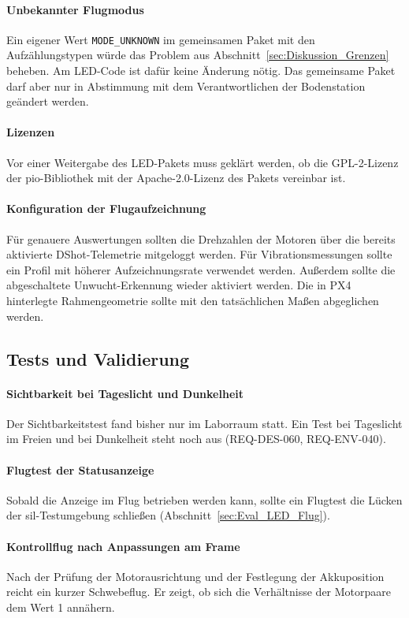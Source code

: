     \paragraph{Unbekannter Flugmodus}
    Ein eigener Wert \texttt{MODE\_UNKNOWN} im gemeinsamen Paket mit den Aufzählungstypen würde das Problem aus Abschnitt~\ref{sec:Diskussion_Grenzen} beheben. Am LED-Code ist dafür keine Änderung nötig. Das gemeinsame Paket darf aber nur in Abstimmung mit dem Verantwortlichen der Bodenstation geändert werden.

    \paragraph{Lizenzen}
    Vor einer Weitergabe des LED-Pakets muss geklärt werden, ob die GPL-2-Lizenz der \gls{pio}-Bibliothek mit der Apache-2.0-Lizenz des Pakets vereinbar ist.

    \paragraph{Konfiguration der Flugaufzeichnung}
    Für genauere Auswertungen sollten die Drehzahlen der Motoren über die bereits aktivierte DShot-Telemetrie mitgeloggt werden. Für Vibrationsmessungen sollte ein Profil mit höherer Aufzeichnungsrate verwendet werden. Außerdem sollte die abgeschaltete Unwucht-Erkennung wieder aktiviert werden. Die in PX4 hinterlegte Rahmengeometrie sollte mit den tatsächlichen Maßen abgeglichen werden.

    \subsection{Tests und Validierung}
    \label{sec:Ausblick_Tests}

    \paragraph{Sichtbarkeit bei Tageslicht und Dunkelheit}
    Der Sichtbarkeitstest fand bisher nur im Laborraum statt. Ein Test bei Tageslicht im Freien und bei Dunkelheit steht noch aus (REQ-DES-060, REQ-ENV-040).

    \paragraph{Flugtest der Statusanzeige}
    Sobald die Anzeige im Flug betrieben werden kann, sollte ein Flugtest die Lücken der \gls{sil}-Testumgebung schließen (Abschnitt~\ref{sec:Eval_LED_Flug}).

    \paragraph{Kontrollflug nach Anpassungen am Frame}
    Nach der Prüfung der Motorausrichtung und der Festlegung der Akkuposition reicht ein kurzer Schwebeflug. Er zeigt, ob sich die Verhältnisse der Motorpaare dem Wert 1 annähern.
